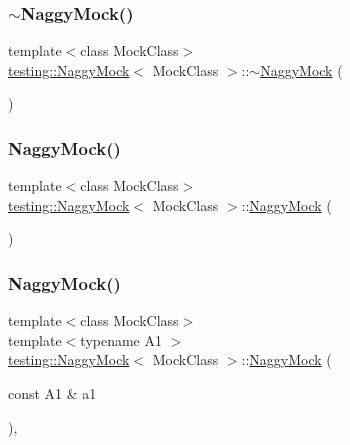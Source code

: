 \subsubsection{\texorpdfstring{$\sim$NaggyMock()}{~NaggyMock()}\hspace{0.1cm}{\footnotesize\ttfamily [2/3]}}
{\footnotesize\ttfamily template$<$class Mock\+Class$>$ \\
\mbox{\hyperlink{classtesting_1_1_naggy_mock}{testing\+::\+Naggy\+Mock}}$<$ Mock\+Class $>$\+::$\sim$\mbox{\hyperlink{classtesting_1_1_naggy_mock}{Naggy\+Mock}} (\begin{DoxyParamCaption}{ }\end{DoxyParamCaption})\hspace{0.3cm}{\ttfamily [inline]}}

\mbox{\label{classtesting_1_1_naggy_mock_acb769f78b93eb60b04db21250f416f70}} 
\subsubsection{\texorpdfstring{NaggyMock()}{NaggyMock()}\hspace{0.1cm}{\footnotesize\ttfamily [7/17]}}
{\footnotesize\ttfamily template$<$class Mock\+Class$>$ \\
\mbox{\hyperlink{classtesting_1_1_naggy_mock}{testing\+::\+Naggy\+Mock}}$<$ Mock\+Class $>$\+::\mbox{\hyperlink{classtesting_1_1_naggy_mock}{Naggy\+Mock}} (\begin{DoxyParamCaption}{ }\end{DoxyParamCaption})\hspace{0.3cm}{\ttfamily [inline]}}

\mbox{\label{classtesting_1_1_naggy_mock_ae43ea6c6a6b66fe31cb14f93e0be5718}} 
\subsubsection{\texorpdfstring{NaggyMock()}{NaggyMock()}\hspace{0.1cm}{\footnotesize\ttfamily [8/17]}}
{\footnotesize\ttfamily template$<$class Mock\+Class$>$ \\
template$<$typename A1 $>$ \\
\mbox{\hyperlink{classtesting_1_1_naggy_mock}{testing\+::\+Naggy\+Mock}}$<$ Mock\+Class $>$\+::\mbox{\hyperlink{classtesting_1_1_naggy_mock}{Naggy\+Mock}} (\begin{DoxyParamCaption}\item[{const A1 \&}]{a1 }\end{DoxyParamCaption})\hspace{0.3cm}{\ttfamily [inline]}, {\ttfamily [explicit]}}

